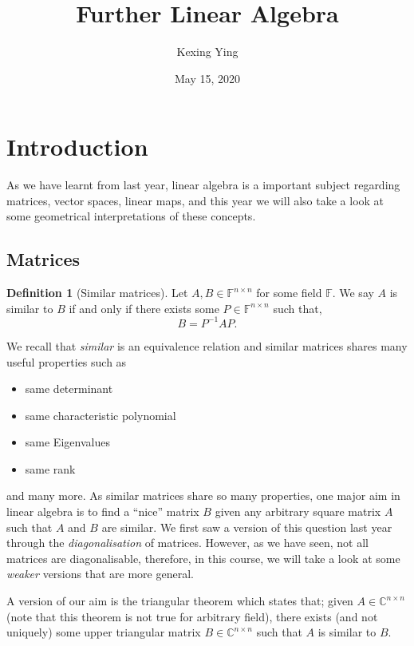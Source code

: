 \documentclass[
]{article}
\title{Further Linear Algebra}
\author{Kexing Ying}
\date{May 15, 2020}
\theoremstyle{definition}
\newtheorem{definition}{Definition}[section]
\begin{document}
\maketitle

{
\hypersetup{linkcolor=}
\setcounter{tocdepth}{2}
\tableofcontents
}
\hypertarget{introduction}{%
\section{Introduction}\label{introduction}}

As we have learnt from last year, linear algebra is a important subject
regarding matrices, vector spaces, linear maps, and this year we will
also take a look at some geometrical interpretations of these concepts.

\hypertarget{matrices}{%
\subsection{Matrices}\label{matrices}}

\begin{definition} [Similar matrices]
  Let \(A, B \in \mathbb{F}^{n \times n}\) for some field \(\mathbb{F}\). 
  We say \(A\) is similar to \(B\) if and only if there exists some 
  \(P \in \mathbb{F}^{n \times n}\) such that, 
  \[B = P^{-1} A P.\]
\end{definition}

We recall that \emph{similar} is an equivalence relation and similar
matrices shares many useful properties such as

\begin{itemize}
  \item same determinant
  \item same characteristic polynomial
  \item same Eigenvalues
  \item same rank
\end{itemize}

and many more. As similar matrices share so many properties, one major
aim in linear algebra is to find a ``nice'' matrix \(B\) given any
arbitrary square matrix \(A\) such that \(A\) and \(B\) are similar. We
first saw a version of this question last year through the
\emph{diagonalisation} of matrices. However, as we have seen, not all
matrices are diagonalisable, therefore, in this course, we will take a
look at some \emph{weaker} versions that are more general.

A version of our aim is the triangular theorem which states that; given
\(A \in \mathbb{C}^{n \times n}\) (note that this theorem is not true
for arbitrary field), there exists (and not uniquely) some upper
triangular matrix \(B \in \mathbb{C}^{n \times n}\) such that \(A\) is
similar to \(B\).
\end{document}
